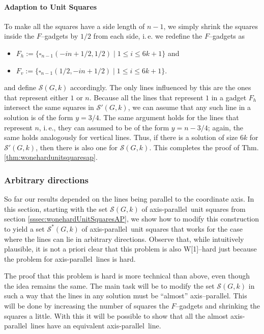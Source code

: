 \documentclass[12pt]{article}
\newcommand{\cclass}[1]{{#1}}
\newcommand{\wone}{\cclass{W[1]}}
\newcommand{\ap}{a.p.\ }
\renewcommand{\ap}{axis-parallel\ }
\newcommand{\calS}{\mathcal{S}}
\begin{document}
\paragraph{Adaption to Unit Squares}
To make all the squares have a side length of $n-1$, we simply shrink the squares inside the $F$--gadgets by $1/2$ from each side, i.\,e. we redefine the $F$--gadgets as 
\begin{itemize}
	\item $F_h := \{ \square_{n-1}(-in + 1/2, 1/2) \mid 1 \leq i \leq 6k+1 \}$ and 
	\item $F_v := \{ \square_{n-1}(1/2, -in + 1/2) \mid 1 \leq i \leq 6k+1 \}$.
\end{itemize}
and define $\calS(G, k)$ accordingly. The only lines influenced by this are the ones that represent either $1$ or $n$. Because all the lines that represent $1$ in a gadget $F_h$ intersect the same squares in $\calS'(G, k)$, we can assume that any such line in a solution is of the form $y = 3/4$. The same argument holds for the lines that represent $n$, i.\,e., they can assumed to be of the form $y = n - 3/4$; again, the same holds analogously for vertical lines. Thus, if there is a solution of size $6k$ for $\calS'(G, k)$, then there is also one for $\calS(G, k)$. This completes the proof of Thm. \ref{thm:wonehardunitsquaresap}. 
\subsubsection{Arbitrary directions}\label{sssec:arbitrary}

So far our results depended on the lines being parallel to the coordinate axis. In this section, starting with the set $\calS(G, k)$ of \ap unit squares from section \ref{sssec:wonehardUnitSquaresAP}, we show how to modify this construction to yield a set $\calS^*(G, k)$ of \ap unit squares that works for the case where the lines can lie in arbitrary directions. Observe that, while intuitively plausible, it is not a priori clear that this problem is also \wone--hard just because the problem for \ap lines is hard.

The proof that this problem is hard is more technical than above, even though the idea remains the same. The main task will be to modify the set $\calS(G, k)$ in such a way that the lines in any solution must be ``almost'' axis--parallel. This will be done by increasing the number of squares the $F$--gadgets and shrinking the squares a little. With this it will be possible to show that all the almost \ap lines have an equivalent \ap line. 
\end{document}
